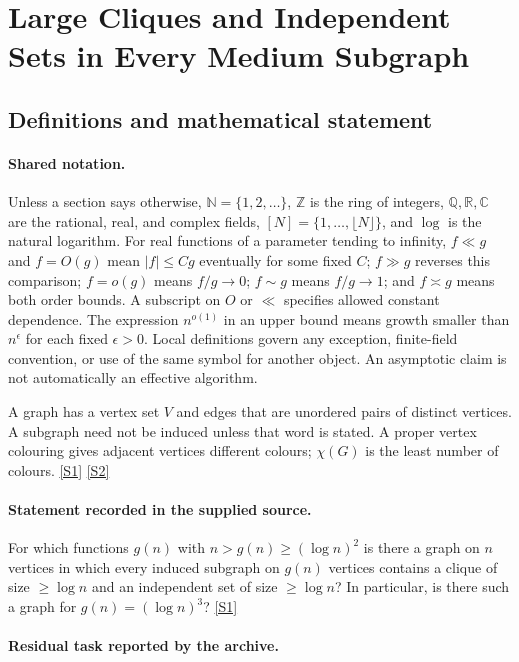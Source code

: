 \documentclass[11pt,a4paper]{article}
\newcommand{\N}{\mathbb{N}}
\newcommand{\Z}{\mathbb{Z}}
\newcommand{\Q}{\mathbb{Q}}
\newcommand{\R}{\mathbb{R}}
\newcommand{\C}{\mathbb{C}}
\newcommand{\sref}[2]{\hyperlink{source:#1:#2}{[S#2]}}
\begin{document}
\section{Large Cliques and Independent Sets in Every Medium Subgraph}\label{statement}


\subsection{Definitions and mathematical statement}

\paragraph{Shared notation.}Unless a section says otherwise, $\N=\{1,2,\ldots\}$,
$\Z$ is the ring of integers, $\Q,\R,\C$ are the rational, real, and complex
fields, $[N]=\{1,\ldots,\lfloor N\rfloor\}$, and $\log$ is the natural
logarithm. For real functions of a parameter tending to infinity,
$f\ll g$ and $f=O(g)$ mean $|f|\leq Cg$ eventually for some fixed $C$;
$f\gg g$ reverses this comparison; $f=o(g)$ means $f/g\to0$;
$f\sim g$ means $f/g\to1$; and $f\asymp g$ means both order bounds.
A subscript on $O$ or $\ll$ specifies allowed constant dependence.
The expression $n^{o(1)}$ in an upper bound means growth smaller than
$n^\epsilon$ for each fixed $\epsilon>0$. Local definitions govern any
exception, finite-field convention, or use of the same symbol for another
object. An asymptotic claim is not automatically an effective algorithm.



A graph has a vertex set $V$ and edges that are unordered pairs of distinct vertices. A subgraph need not be induced unless that word is stated. A proper vertex colouring gives adjacent vertices different colours; $\chi(G)$ is the least number of colours. \sref{statement}{1} \sref{statement}{2}

\paragraph{Statement recorded in the supplied source.}
For which functions $g(n)$ with $n>g(n)\geq (\log n)^2$ is there a graph on $n$ vertices in which every induced subgraph on $g(n)$ vertices contains a clique of size $\geq \log n$ and an independent set of size $\geq \log n$?
In particular, is there such a graph for $g(n)=(\log n)^3$? \sref{statement}{1}

\paragraph{Residual task reported by the archive.}
\end{document}
